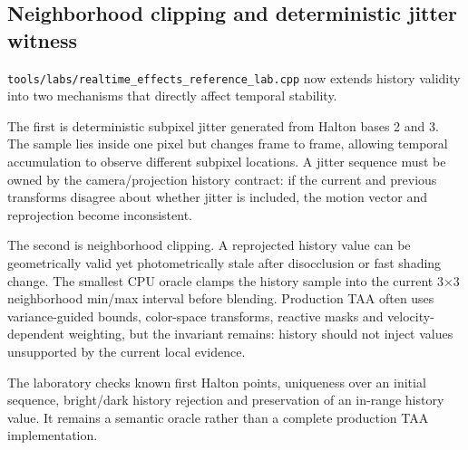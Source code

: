 \subsection{Neighborhood clipping and deterministic jitter witness}\label{appendix-0727340a4428-neighborhood-clipping-and-deterministic-jitter-witness}

\hypertarget{appendix-0727340a4428-neighborhood-clipping-and-deterministic-jitter-witness}{}

\texttt{tools/labs/realtime\_effects\_reference\_lab.cpp} now extends history validity into two mechanisms that directly affect temporal stability.

The first is deterministic subpixel jitter generated from Halton bases 2 and 3. The sample lies inside one pixel but changes frame to frame, allowing temporal accumulation to observe different subpixel locations. A jitter sequence must be owned by the camera/projection history contract: if the current and previous transforms disagree about whether jitter is included, the motion vector and reprojection become inconsistent.

The second is neighborhood clipping. A reprojected history value can be geometrically valid yet photometrically stale after disocclusion or fast shading change. The smallest CPU oracle clamps the history sample into the current 3×3 neighborhood min/max interval before blending. Production TAA often uses variance-guided bounds, color-space transforms, reactive masks and velocity-dependent weighting, but the invariant remains: history should not inject values unsupported by the current local evidence.

The laboratory checks known first Halton points, uniqueness over an initial sequence, bright/dark history rejection and preservation of an in-range history value. It remains a semantic oracle rather than a complete production TAA implementation.
